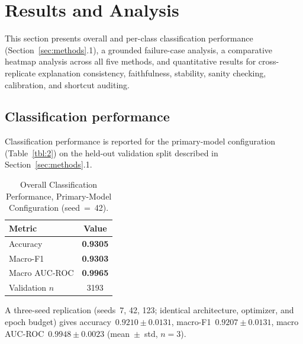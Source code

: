 \section{Results and Analysis}
\label{sec:results}

This section presents overall and per-class classification performance (Section~\ref{sec:methods}.1), a grounded failure-case analysis, a comparative heatmap analysis across all five methods, and quantitative results for cross-replicate explanation consistency, faithfulness, stability, sanity checking, calibration, and shortcut auditing.

\subsection{Classification performance}

Classification performance is reported for the primary-model configuration (Table~\ref{tbl:2}) on the held-out validation split described in Section~\ref{sec:methods}.1.

\begin{table}[!ht]
\centering
\caption{Overall Classification Performance, Primary-Model Configuration (seed~=~42).}
\label{tbl:3}
\begin{tabular}{lc}
\toprule
Metric & Value \\
\midrule
Accuracy & \textbf{0.9305} \\
Macro-F1 & \textbf{0.9303} \\
Macro AUC-ROC & \textbf{0.9965} \\
Validation $n$ & 3193 \\
\bottomrule
\end{tabular}

\vspace{2pt}
\raggedright\footnotesize A three-seed replication (seeds~7, 42, 123; identical architecture, optimizer, and epoch budget) gives accuracy~$0.9210\pm0.0131$, macro-F1~$0.9207\pm0.0131$, macro AUC-ROC~$0.9948\pm0.0023$ (mean~$\pm$~std, $n=3$).
\end{table}

